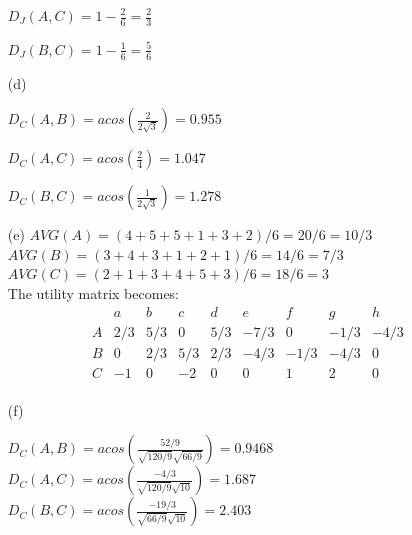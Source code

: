 \documentclass{article}
\begin{document}
\begin{enumerate}
        \(D_J(A,C) = 1 - \frac{2}{6} = \frac{2}{3}\)

        \(D_J(B,C) = 1 - \frac{1}{6} = \frac{5}{6}\)
    \item[(d)]

        \(D_C(A,B) = acos(\frac{2}{2\sqrt{3}}) = 0.955\)

        \(D_C(A,C) = acos(\frac{2}{4}) = 1.047\)

        \(D_C(B,C) = acos(\frac{1}{2\sqrt{3}}) = 1.278\)
    
    \item[(e)]
        \( AVG(A) = (4+5+5+1+3+2)/6 = 20/6 = 10/3 \) \\
        \( AVG(B) = (3+4+3+1+2+1)/6 = 14/6 = 7/3\) \\
        \( AVG(C) = (2+1+3+4+5+3)/6 = 18/6 = 3\) \\

        The utility matrix becomes:
        \[
        \begin{array}{c|cccccccc}
        & a & b & c & d & e & f & g & h \\
        \hline
        A & 2/3 & 5/3 & 0 & 5/3 & -7/3 & 0 & -1/3 & -4/3 \\
        B & 0 & 2/3 & 5/3 & 2/3 & -4/3 & -1/3 & -4/3 & 0 \\
        C & -1 & 0 & -2 & 0 & 0 & 1 & 2 & 0\\
        \end{array}
        \]
    \item[(f)]

    \(D_C(A,B) = acos(\frac{52/9}{\sqrt{120/9}\sqrt{66/9}}) =  0.9468 \) \\
    \(D_C(A,C) = acos(\frac{-4/3}{\sqrt{120/9}\sqrt{10}}) = 1.687 \) \\
    \(D_C(B,C) = acos(\frac{-19/3}{\sqrt{66/9}\sqrt{10}}) = 2.403 \)

\end{enumerate}
\end{document}
